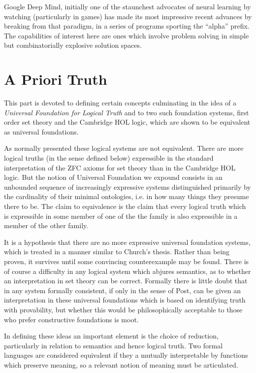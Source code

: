 \documentclass[10pt,titlepage]{book}
\begin{document}
Google Deep Mind, initially one of the staunchest advocates of neural learning by watching (particularly in games) has made its most impressive recent advances by breaking from that paradigm, in a series of programs sporting the ``alpha'' prefix.
The capabilities of interest here are ones which involve problem solving in simple but combinatorially explosive solution spaces.

\chapter{A Priori Truth}

This part is devoted to defining certain concepts culminating in the idea of a \emph{Universal Foundation for Logical Truth} and to two such foundation systems, first order set theory and the Cambridge HOL logic, which are shown to be equivalent as universal foundations.

As normally presented these logical systems are not equivalent.
There are more logical truths (in the sense defined below) expressible in the standard interpretation of the ZFC axioms for set theory than in the Cambridge HOL logic.
But the notion of Universal Foundation we expound consists in an unbounded sequence of increasingly expressive systems distinguished primarily by the cardinality of their minimal ontologies, i.e. in how many things they presume there to be.
The claim to equivalence is the claim that every logical truth which is expressible in some member of one of the the family is also expressible in a member of the other family.

It is a hypothesis that there are no more expressive universal foundation systems, which is treated in a manner similar to Church's thesis.
Rather than being proven, it survives until some convincing counterexample may be found.
There is of course a difficulty in any logical system which abjures semantics, as to whether an interpretation in set theory can be correct.
Formally there is little doubt that in any system formally consistent, if only in the sense of Post, can be given an interpretation in these universal foundations which is based on identifying truth with provability, but whether this would be philosophically acceptable to those who prefer constructive foundations is moot.

In defining these ideas an important element is the choice of reduction, particularly in relation to semantics and hence logical truth.
Two formal languages are considered equivalent if they a mutually interpretable by functions which preserve meaning, so a relevant notion of meaning must be articulated.
\end{document}
